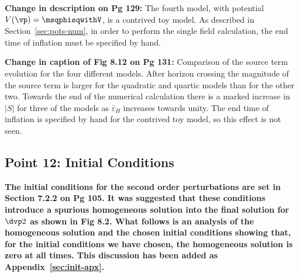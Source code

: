 \textbf{Change in description on Pg 129:}
The fourth model, with potential $V(\vp)=\msqphisqwithV$, is a contrived toy model.
As described in Section~\ref{sec:pots-num}, in order to perform the single field
calculation, the end time of inflation must be specified by hand. 

\textbf{Change in caption of Fig 8.12 on Pg 131:}
Comparison of the
source term
evolution for the four different models. After horizon crossing the magnitude of the
source term is larger for the quadratic and quartic models than for the other two.
Towards the end of the numerical calculation there is a marked increase in $|S|$ for
three of the models as $\bar{\varepsilon}_H$ increases towards unity. The end time of
inflation is specified by hand for the contrived toy model, so this effect is
not seen.

\subsection{Point 12: Initial Conditions}
\textbf{The initial conditions for the second order perturbations are set in Section 7.2.2 on Pg
105. It was suggested that these conditions introduce a spurious homogeneous solution into the
final solution for $\dvp2$ as shown in Fig 8.2. What follows is an analysis of the homogeneous
solution and the chosen initial conditions showing that, for the initial conditions we have
chosen, the homogeneous solution is zero at all times. This discussion has been added as
Appendix~\ref{sec:init-apx}.}

